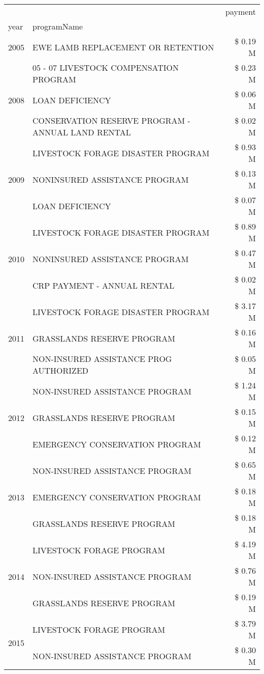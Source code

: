 \begin{tabular}{llr}
\toprule
 &  & payment \\
year & programName &  \\
\midrule
2005 & EWE LAMB REPLACEMENT OR RETENTION & \$ 0.19 M \\
\cline{1-3}
\multirow[t]{3}{*}{2008} & 05 - 07 LIVESTOCK COMPENSATION PROGRAM & \$ 0.23 M \\
 & LOAN DEFICIENCY & \$ 0.06 M \\
 & CONSERVATION RESERVE PROGRAM - ANNUAL LAND RENTAL & \$ 0.02 M \\
\cline{1-3}
\multirow[t]{3}{*}{2009} & LIVESTOCK FORAGE DISASTER  PROGRAM & \$ 0.93 M \\
 & NONINSURED ASSISTANCE PROGRAM & \$ 0.13 M \\
 & LOAN DEFICIENCY & \$ 0.07 M \\
\cline{1-3}
\multirow[t]{3}{*}{2010} & LIVESTOCK FORAGE DISASTER PROGRAM & \$ 0.89 M \\
 & NONINSURED ASSISTANCE PROGRAM & \$ 0.47 M \\
 & CRP PAYMENT - ANNUAL RENTAL & \$ 0.02 M \\
\cline{1-3}
\multirow[t]{3}{*}{2011} & LIVESTOCK FORAGE DISASTER PROGRAM & \$ 3.17 M \\
 & GRASSLANDS RESERVE PROGRAM & \$ 0.16 M \\
 & NON-INSURED ASSISTANCE PROG AUTHORIZED & \$ 0.05 M \\
\cline{1-3}
\multirow[t]{3}{*}{2012} & NON-INSURED ASSISTANCE PROGRAM & \$ 1.24 M \\
 & GRASSLANDS RESERVE PROGRAM & \$ 0.15 M \\
 & EMERGENCY CONSERVATION PROGRAM & \$ 0.12 M \\
\cline{1-3}
\multirow[t]{3}{*}{2013} & NON-INSURED ASSISTANCE PROGRAM & \$ 0.65 M \\
 & EMERGENCY CONSERVATION PROGRAM & \$ 0.18 M \\
 & GRASSLANDS RESERVE PROGRAM & \$ 0.18 M \\
\cline{1-3}
\multirow[t]{3}{*}{2014} & LIVESTOCK FORAGE PROGRAM & \$ 4.19 M \\
 & NON-INSURED ASSISTANCE PROGRAM & \$ 0.76 M \\
 & GRASSLANDS RESERVE PROGRAM & \$ 0.19 M \\
\cline{1-3}
\multirow[t]{3}{*}{2015} & LIVESTOCK FORAGE PROGRAM & \$ 3.79 M \\
 & NON-INSURED ASSISTANCE PROGRAM & \$ 0.30 M \\

\end{tabular}
